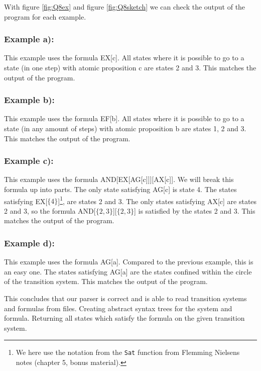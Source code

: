 With figure \ref{fig:Q8ex} and figure \ref{fig:Q8sketch} we can check the output of the program for each example.

\subsubsection*{Example a):}
This example uses the formula EX[c]. All states where it is possible to go to a state (in one step) with atomic proposition c are states 2 and 3. This matches the output of the program.

\subsubsection*{Example b):}
This example uses the formula EF[b]. All states where it is possible to go to a state (in any amount of steps) with atomic proposition b are states 1, 2 and 3. This matches the output of the program.

\subsubsection*{Example c):}
This example uses the formula AND[EX[AG[c]]][AX[c]]. We will break this formula up into parts. The only state satisfying AG[c] is state 4. The states satisfying EX[$\{4\}$]\footnote{We here use the notation from the \texttt{Sat} function from Flemming Nielsens notes (chapter 5, bonus material).}, are states 2 and 3. The only states satisfying AX[c] are states 2 and 3, so the formula AND[$\{2, 3\}$][$\{2, 3\}$] is satisfied by the states 2 and 3. This matches the output of the program.

\subsubsection*{Example d):}
This example uses the formula AG[a]. Compared to the previous example, this is an easy one. The states satisfying AG[a] are the states confined within the circle of the transition system. This matches the output of the program.

\vspace{5mm}
This concludes that our parser is correct and is able to read transition systems and formulas from files. Creating abstract syntax trees for the system and formula. Returning all states which satisfy the formula on the given transition system.
